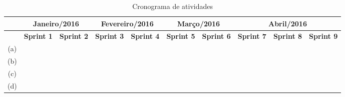 \begin{table}[]
\centering
\tiny
\caption{Cronograma de atividades}
\label{cronograma}
\begin{tabular}{|c|l|l|l|l|l|l|l|l|l|}
\hline
\multicolumn{1}{|l|}{\textbf{}} & \multicolumn{2}{c|}{\textbf{Janeiro/2016}}                                                & \multicolumn{2}{c|}{\textbf{Fevereiro/2016}}                                      & \multicolumn{2}{c|}{\textbf{Março/2016}}                                         & \multicolumn{3}{c|}{\textbf{Abril/2016}}                                                                                 \\ \hline
\multicolumn{1}{|l|}{\textbf{}} & \multicolumn{1}{c|}{\textbf{Sprint 1}}          & \multicolumn{1}{c|}{\textbf{Sprint 2}}  & \multicolumn{1}{c|}{\textbf{Sprint 3}}  & \multicolumn{1}{c|}{\textbf{Sprint 4}}  & \multicolumn{1}{c|}{\textbf{Sprint 5}} & \multicolumn{1}{c|}{\textbf{Sprint 6}}  & \multicolumn{1}{c|}{\textbf{Sprint 7}} & \multicolumn{1}{c|}{\textbf{Sprint 8}} & \multicolumn{1}{c|}{\textbf{Sprint 9}} \\ \hline
(a)                             & \cellcolor[HTML]{C0C0C0}                        &                                         &                                         &                                         &                                        &                                         &                                        &                                        &                                        \\ \hline
(b)                             & \cellcolor[HTML]{C0C0C0}{\color[HTML]{C0C0C0} } & \cellcolor[HTML]{C0C0C0}                &                                         &                                         &                                        &                                         & \cellcolor[HTML]{C0C0C0}               &                                        &                                        \\ \hline
(c)                             &                                                 &                                         & \cellcolor[HTML]{C0C0C0}                &                                         &                                        &                                         & \cellcolor[HTML]{C0C0C0}               &                                        &                                        \\ \hline
(d)                             &                                                 &                                         &                                         & \cellcolor[HTML]{C0C0C0}                & \cellcolor[HTML]{C0C0C0}               &                                         &                                        & \cellcolor[HTML]{C0C0C0}               & \cellcolor[HTML]{C0C0C0}               \\ \hline

\end{tabular}
\end{table}
